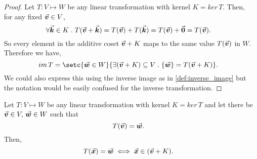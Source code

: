 \documentclass[../MathsNotesBase.tex]{subfiles}
\begin{document}
{		\medskip
		\begin{proof}
			Let ${ T: V \longmapsto W }$ be any linear transformation with kernel ${ K = ker\,T }$. Then, for any fixed ${ \vec{\bm{v}} \in V }$,
			\[ \forall \vec{\bm{k}} \in K \;.\; T(\vec{\bm{v}} + \vec{\bm{k}}) = T(\vec{\bm{v}}) + T(\vec{\bm{k}}) = T(\vec{\bm{v}}) + \vec{\bm{0}} = T(\vec{\bm{v}}). \]
			So every element in the additive coset ${ \vec{\bm{v}} + K }$ maps to the same value $T(\vec{\bm{v}})$ in $W$. Therefore we have,
			\[ im\,T = \setc{\w \in W}{\exists (\v + K) \subseteq V \logicsep \{\w\} = T(\v + K)}. \]
			We could also express this using the inverse image as in \ref{def:inverse_image} but the notation would be easily confused for the inverse transformation.
		\end{proof}
		\smallskip
		\begin{corollary}
			Let ${ T: V \longmapsto W }$ be any linear transformation with kernel ${ K = ker\,T }$ and let there be ${ \vec{\bm{v}} \in V,\, \vec{\bm{w}} \in W }$ such that 
				\[ T(\vec{\bm{v}}) = \vec{\bm{w}}. \] 
			Then,
				\[ T(\vec{\bm{x}}) = \vec{\bm{w}} \iff \vec{\bm{x}} \in (\vec{\bm{v}} + K). \]
		\end{corollary}
	
}
\end{document}
